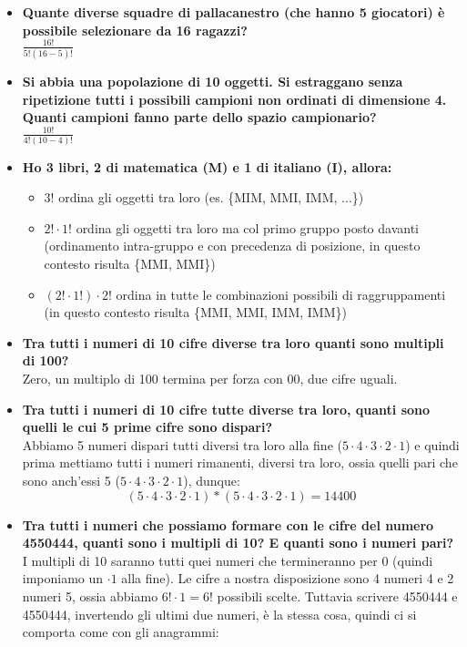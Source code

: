 \documentclass[11pt]{report}
\begin{document}
\begin{itemize}
	\item \textbf{Quante diverse squadre di pallacanestro (che hanno 5 giocatori) è possibile selezionare da 16 ragazzi?}\\
	$\frac{16!}{5!(16-5)!}$
	\item \textbf{Si abbia una popolazione di 10 oggetti. Si estraggano senza ripetizione tutti i possibili campioni non ordinati
di dimensione 4. Quanti campioni fanno parte dello spazio campionario?}\\
	$\frac{10!}{4!(10-4)!}$
	\item \textbf{Ho 3 libri, 2 di matematica (M) e 1 di italiano (I), allora:}
	\begin{itemize}
		\item $3!$ ordina gli oggetti tra loro (es. \{MIM, MMI, IMM, ...\})
		\item $2! \cdot 1!$ ordina gli oggetti tra loro ma col primo gruppo posto davanti (ordinamento intra-gruppo e con precedenza di posizione, in questo contesto risulta \{MMI, MMI\})
		\item $(2! \cdot 1!) \cdot 2!$ ordina in tutte le combinazioni possibili di raggruppamenti (in questo contesto risulta \{MMI, MMI, IMM, IMM\})
	\end{itemize}
	\item \textbf{Tra tutti i numeri di 10 cifre diverse tra loro quanti sono multipli di 100?}\\
	Zero, un multiplo di 100 termina per forza con 00, due cifre uguali.
	\item \textbf{Tra tutti i numeri di 10 cifre tutte diverse tra loro, quanti sono quelli le cui 5 prime cifre sono dispari?}\\
	Abbiamo 5 numeri dispari tutti diversi tra loro alla fine ($5 \cdot 4 \cdot 3 \cdot 2 \cdot 1$) e quindi prima mettiamo tutti i numeri rimanenti, diversi tra loro, ossia quelli pari che sono anch'essi 5 ($5 \cdot 4 \cdot 3 \cdot 2 \cdot 1$), dunque:
	$$(5 \cdot 4 \cdot 3 \cdot 2 \cdot 1) * (5 \cdot 4 \cdot 3 \cdot 2 \cdot 1) = 14400$$
	\item \textbf{Tra tutti i numeri che possiamo formare con le cifre del numero 4550444, quanti sono i multipli di 10? E quanti sono i numeri pari?}\\
	I multipli di 10 saranno tutti quei numeri che termineranno per 0 (quindi imponiamo un $\cdot 1$ alla fine). Le cifre a nostra disposizione sono 4 numeri 4 e 2 numeri 5, ossia abbiamo $6! \cdot 1 = 6!$ possibili scelte. Tuttavia scrivere 4550444 e 4550444, invertendo gli ultimi due numeri, è la stessa cosa, quindi ci si comporta come con gli anagrammi:

\end{itemize}
\end{document}
